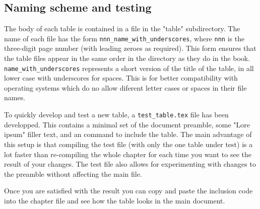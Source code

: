 \documentclass{report}
\begin{document}
\subsection{Naming scheme and testing}
The body of each table is contained in a file in the "table" subdirectory.
The name of each file has the form \verb+nnn_name_with_underscores+, where
\verb+nnn+ is the three-digit page number (with leading zeroes as required).
This form ensures that the table files appear in the same order in the
directory as they do in the book.
\verb+name_with_underscores+ represents a short version of
the title of the table, in all lower case
with underscores for spaces.
This is for better compatibility with operating
systems which do no allow diferent letter cases or spaces in their file names.

To quickly develop and test a new table, a \verb+test_table.tex+ file has
been developped.
This contains a minimal set of the document preamble, some "Lore ipsum"
filler text, and an \verb++ command to include the table.
The main advantage of this setup is that compiling the test file (with only
the one table under test) is a lot faster than re-compiling the whole
chapter for each time you want to see the result of your changes.
The test file also allows for experimenting with changes to the preamble
without affecting the main file.

Once you are satisfied with the result you can copy and paste the inclusion
code into the chapter file and see how the table looks in the main document.

\end{document}
